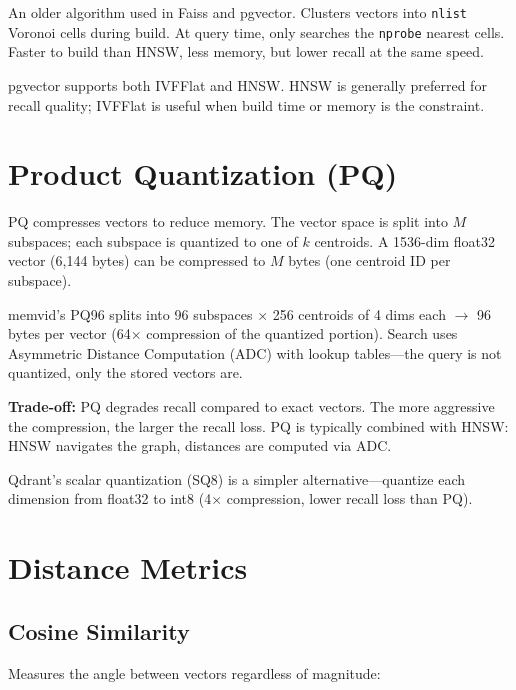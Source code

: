 An older algorithm used in Faiss and pgvector. Clusters vectors into \texttt{nlist} Voronoi
cells during build. At query time, only searches the \texttt{nprobe} nearest cells. Faster to
build than HNSW, less memory, but lower recall at the same speed.

pgvector supports both IVFFlat and HNSW. HNSW is generally preferred for recall quality;
IVFFlat is useful when build time or memory is the constraint.

\section{Product Quantization (PQ)}

PQ compresses vectors to reduce memory. The vector space is split into $M$ subspaces; each
subspace is quantized to one of $k$ centroids. A 1536-dim float32 vector (6{,}144 bytes) can
be compressed to $M$ bytes (one centroid ID per subspace).

memvid's PQ96 splits into 96 subspaces $\times$ 256 centroids of 4 dims each $\to$ 96 bytes
per vector (64$\times$ compression of the quantized portion). Search uses Asymmetric Distance
Computation (ADC) with lookup tables---the query is not quantized, only the stored vectors are.

\textbf{Trade-off:} PQ degrades recall compared to exact vectors. The more aggressive the
compression, the larger the recall loss. PQ is typically combined with HNSW: HNSW navigates
the graph, distances are computed via ADC.

Qdrant's scalar quantization (SQ8) is a simpler alternative---quantize each dimension from
float32 to int8 (4$\times$ compression, lower recall loss than PQ).

\section{Distance Metrics}

\subsection{Cosine Similarity}

Measures the angle between vectors regardless of magnitude:

